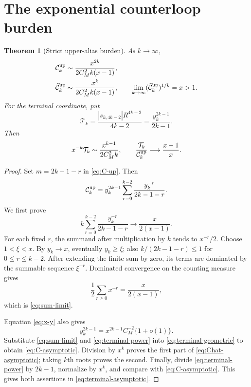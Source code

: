 \documentclass[11pt]{article}
\newtheorem{theorem}{Theorem}[section]
\theoremstyle{remark}
\begin{document}
\section{The exponential counterloop burden}

\begin{theorem}[Strict upper-alias burden]\label{thm:burden}
As $k\to\infty$,
\begin{align}
 \mathcal C_k^{\rm up}
 &\sim\frac{x^{2k}}{2C_M^2k(x-1)},
 \label{eq:C-asymptotic}\\
 \widehat{\mathcal C}_k^{\rm up}
 &\sim\frac{x^k}{2C_M^2k(x-1)},
 \qquad
 \lim_{k\to\infty}
 (\widehat{\mathcal C}_k^{\rm up})^{1/k}=x>1.
 \label{eq:Chat-asymptotic}
\end{align}
For the terminal coordinate, put
\begin{equation}\label{eq:terminal-definition}
 \mathcal T_k
 =\frac{|s_{k,4k-2}|R^{4k-2}}{4k-2}
 =\frac{y_k^{2k-1}}{2k-1}.
\end{equation}
Then
\begin{equation}\label{eq:terminal-asymptotic}
 x^{-k}\mathcal T_k
 \sim\frac{x^{k-1}}{2C_M^2k},
 \qquad
 \frac{\mathcal T_k}{\mathcal C_k^{\rm up}}
 \longrightarrow\frac{x-1}{x}.
\end{equation}
\end{theorem}

\begin{proof}
Set $m=2k-1-r$ in \eqref{eq:C-up}.  Then
\begin{equation}\label{eq:terminal-geometric}
 \mathcal C_k^{\rm up}
 =y_k^{2k-1}\sum_{r=0}^{k-2}
 \frac{y_k^{-r}}{2k-1-r}.
\end{equation}
We first prove
\begin{equation}\label{eq:sum-limit}
 k\sum_{r=0}^{k-2}\frac{y_k^{-r}}{2k-1-r}
 \longrightarrow\frac{x}{2(x-1)}.
\end{equation}
For each fixed $r$, the summand after multiplication by $k$ tends to
$x^{-r}/2$.  Choose $1<\xi<x$.  By $y_k\to x$, eventually $y_k\ge\xi$;
also $k/(2k-1-r)\le1$ for $0\le r\le k-2$.  After extending the finite
sum by zero, its terms are dominated by the summable sequence $\xi^{-r}$.
Dominated convergence on the counting measure gives
\[
 \frac12\sum_{r\ge0}x^{-r}=\frac{x}{2(x-1)},
\]
which is \eqref{eq:sum-limit}.

Equation \eqref{eq:x-y} also gives
\begin{equation}\label{eq:terminal-power}
 y_k^{2k-1}
 =x^{2k-1}C_M^{-2}\{1+o(1)\}.
\end{equation}
Substitute \eqref{eq:sum-limit} and \eqref{eq:terminal-power} into
\eqref{eq:terminal-geometric} to obtain \eqref{eq:C-asymptotic}.  Division
by $x^k$ proves the first part of \eqref{eq:Chat-asymptotic}; taking $k$th
roots proves the second.  Finally, divide \eqref{eq:terminal-power} by
$2k-1$, normalize by $x^k$, and compare with
\eqref{eq:C-asymptotic}.  This gives both assertions in
\eqref{eq:terminal-asymptotic}.
\end{proof}
\end{document}
